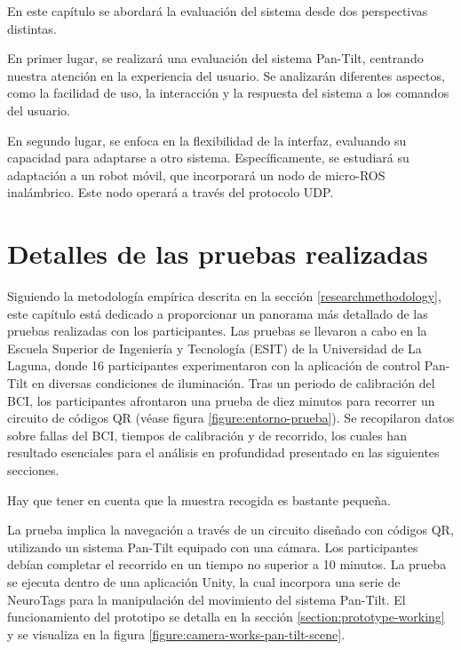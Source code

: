 En este capítulo se abordará la evaluación del sistema desde dos perspectivas distintas.



En primer lugar, se realizará una evaluación del sistema Pan-Tilt, centrando nuestra atención en la experiencia del usuario. Se analizarán diferentes aspectos, como la facilidad de uso, la interacción y la respuesta del sistema a los comandos del usuario.



En segundo lugar, se enfoca en la flexibilidad de la interfaz, evaluando su capacidad para adaptarse a otro sistema. Específicamente, se estudiará su adaptación a un robot móvil, que incorporará un nodo de micro-ROS inalámbrico. Este nodo operará a través del protocolo UDP.

\section{Detalles de las pruebas realizadas}

Siguiendo la metodología empírica descrita en la sección \ref{researchmethodology}, este capítulo est\'a dedicado a proporcionar un panorama más detallado de las pruebas realizadas con los participantes. Las pruebas se llevaron a cabo en la Escuela Superior de Ingeniería y Tecnología (ESIT) de la Universidad de La Laguna, donde 16 participantes experimentaron con la aplicación de control Pan-Tilt en diversas condiciones de iluminación. Tras un periodo de calibración del BCI, los participantes afrontaron una prueba de diez minutos para recorrer un circuito de códigos QR (véase figura \ref{figure:entorno-prueba}). Se recopilaron datos sobre fallas del BCI, tiempos de calibración y de recorrido, los cuales han resultado esenciales para el análisis en profundidad presentado en las siguientes secciones.



Hay que tener en cuenta que la muestra recogida es bastante pequeña. 



La prueba implica la navegación a través de un circuito diseñado con códigos QR, utilizando un sistema Pan-Tilt equipado con una cámara. Los participantes debían completar el recorrido en un tiempo no superior a 10 minutos. La prueba se ejecuta dentro de una aplicación Unity, la cual incorpora una serie de NeuroTags para la manipulación del movimiento del sistema Pan-Tilt. El funcionamiento del prototipo se detalla en la sección \ref{section:prototype-working} y se visualiza en la figura \ref{figure:camera-works-pan-tilt-scene}.


